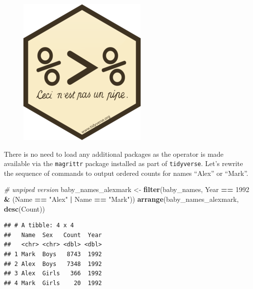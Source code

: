 \documentclass[]{book}
\newenvironment{Shaded}{\begin{snugshade}}{\end{snugshade}}
\newcommand{\KeywordTok}[1]{\textcolor[rgb]{0.13,0.29,0.53}{\textbf{#1}}}
\newcommand{\DecValTok}[1]{\textcolor[rgb]{0.00,0.00,0.81}{#1}}
\newcommand{\StringTok}[1]{\textcolor[rgb]{0.31,0.60,0.02}{#1}}
\newcommand{\CommentTok}[1]{\textcolor[rgb]{0.56,0.35,0.01}{\textit{#1}}}
\newcommand{\OperatorTok}[1]{\textcolor[rgb]{0.81,0.36,0.00}{\textbf{#1}}}
\newcommand{\NormalTok}[1]{#1}
\begin{document}
\begin{figure}
\centering
\includegraphics{R/Rintro/images/magrittr.png}
\caption{}
\end{figure}

There is no need to load any additional packages as the operator is made
available via the \texttt{magrittr} package installed as part of
\texttt{tidyverse}. Let's rewrite the sequence of commands to output
ordered counts for names ``Alex'' or ``Mark''.

\begin{Shaded}
\begin{Highlighting}[]
\CommentTok{# unpiped version}
\NormalTok{baby_names_alexmark <-}\StringTok{ }\KeywordTok{filter}\NormalTok{(baby_names, Year }\OperatorTok{==}\StringTok{ }\DecValTok{1992} \OperatorTok{&}\StringTok{ }\NormalTok{(Name }\OperatorTok{==}\StringTok{ "Alex"} \OperatorTok{|}\StringTok{ }\NormalTok{Name }\OperatorTok{==}\StringTok{ "Mark"}\NormalTok{))}
\KeywordTok{arrange}\NormalTok{(baby_names_alexmark, }\KeywordTok{desc}\NormalTok{(Count))}
\end{Highlighting}
\end{Shaded}

\begin{verbatim}
## # A tibble: 4 x 4
##   Name  Sex   Count  Year
##   <chr> <chr> <dbl> <dbl>
## 1 Mark  Boys   8743  1992
## 2 Alex  Boys   7348  1992
## 3 Alex  Girls   366  1992
## 4 Mark  Girls    20  1992
\end{verbatim}

\begin{Shaded}
\end{Shaded}
\end{document}
